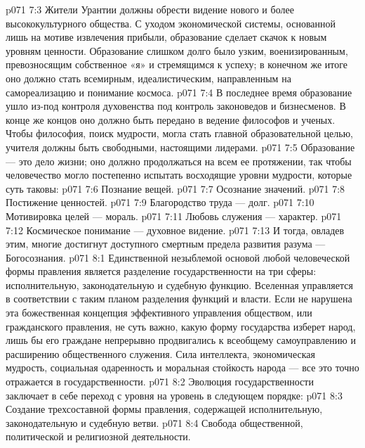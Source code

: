 \vs p071 7:3 Жители Урантии должны обрести видение нового и более высококультурного общества. С уходом экономической системы, основанной лишь на мотиве извлечения прибыли, образование сделает скачок к новым уровням ценности. Образование слишком долго было узким, военизированным, превозносящим собственное «я» и стремящимся к успеху; в конечном же итоге оно должно стать всемирным, идеалистическим, направленным на самореализацию и понимание космоса.
\vs p071 7:4 В последнее время образование ушло из\hyp{}под контроля духовенства под контроль законоведов и бизнесменов. В конце же концов оно должно быть передано в ведение философов и ученых. Чтобы философия, поиск мудрости, могла стать главной образовательной целью, учителя должны быть свободными, настоящими лидерами.
\vs p071 7:5 Образование --- это дело жизни; оно должно продолжаться на всем ее протяжении, так чтобы человечество могло постепенно испытать восходящие уровни мудрости, которые суть таковы:
\vs p071 7:6 \bibnobreakspace Познание вещей.
\vs p071 7:7 \bibnobreakspace Осознание значений.
\vs p071 7:8 \bibnobreakspace Постижение ценностей.
\vs p071 7:9 \bibnobreakspace Благородство труда --- долг.
\vs p071 7:10 \bibnobreakspace Мотивировка целей --- мораль.
\vs p071 7:11 \bibnobreakspace Любовь служения --- характер.
\vs p071 7:12 \bibnobreakspace Космическое понимание --- духовное видение.
\vs p071 7:13 \pc И тогда, овладев этим, многие достигнут доступного смертным предела развития разума --- Богосознания.
\vs p071 8:1 Единственной незыблемой основой любой человеческой формы правления является разделение государственности на три сферы: исполнительную, законодательную и судебную функцию. Вселенная управляется в соответствии с таким планом разделения функций и власти. Если не нарушена эта божественная концепция эффективного управления обществом, или гражданского правления, не суть важно, какую форму государства изберет народ, лишь бы его граждане непрерывно продвигались к всеобщему самоуправлению и расширению общественного служения. Сила интеллекта, экономическая мудрость, социальная одаренность и моральная стойкость народа --- все это точно отражается в государственности.
\vs p071 8:2 Эволюция государственности заключает в себе переход с уровня на уровень в следующем порядке:
\vs p071 8:3 \bibnobreakspace Создание трехсоставной формы правления, содержащей исполнительную, законодательную и судебную ветви.
\vs p071 8:4 \pc {}\bibnobreakspace Свобода общественной, политической и религиозной деятельности.
